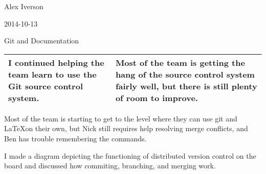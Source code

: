Alex Iverson

2014-10-13

Git and Documentation

\begin{tabular}{|p{5cm}|p{5cm}|}
 \hline
 I continued helping the team learn to use the Git source control system.&
 Most of the team is getting the hang of the source control system fairly well, but there is still plenty of room to improve.\\
 \hline
\end{tabular}

\medskip 

Most of the team is starting to get to the level where they can use git and \LaTeX on their own, but Nick still requires help resolving merge conflicts, and Ben has trouble remembering the commands.

I made a diagram depicting the functioning of distributed version control on the board and discussed how commiting, branching, and merging work.